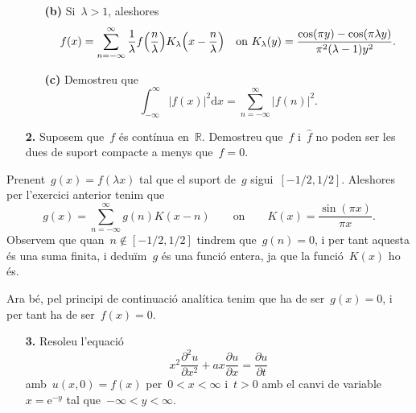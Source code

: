 \documentclass[a4paper]{article}
\theoremstyle{plain}
\theoremstyle{definition}
\newcommand{\e}{\mathrm{e}}
\providecommand{\uppi}{\pi}
\newcommand{\diff}{\mathrm{d}}
\newcommand{\abs}[1]{\lvert{#1}\rvert}
\newcommand{\RR}{\mathbb{R}}
\begin{document}
\begin{enumerate}
    \item[]\begin{enumerate}
        \item[\textbf{(b)}] Si~\(\lambda > 1\), aleshores
            \[
                f(x) =
                \sum_{n=-\infty}^{\infty}
                \frac{1}{\lambda} f\Bigl(\frac{n}{\lambda}\Bigr)
                K_{\lambda}\Bigl(x-\frac{n}{\lambda}\Bigr)
                \quad\text{on}\ %
                K_{\lambda}(y) =
                \frac{\cos(\uppi y) - \cos(\uppi\lambda y)}
                {\uppi^{2}(\lambda-1)y^{2}}.
            \]
    \end{enumerate}
\end{enumerate}


\begin{enumerate}
    \item[]\begin{enumerate}
        \item[\textbf{(c)}] Demostreu que
            \[
                \int_{-\infty}^{\infty}
                \abs{f(x)}^{2}
                \diff x
                =
                \sum_{n=-\infty}^{\infty}
                \abs{f(n)}^{2}.
            \]
    \end{enumerate}
\end{enumerate}

\begin{enumerate}
    \item[\textbf{2.}] Suposem que~\(f\) és contínua en~\(\RR\).
        Demostreu que~\(f\) i~\(\widehat{f}\) no poden ser les dues de suport
        compacte a menys que~\(f=0\).
\end{enumerate}

Prenent~\(g(x)=f(\lambda x)\) tal que el suport de~\(g\) sigui~\([-1/2,1/2]\).
Aleshores per l'exercici anterior tenim que
\[
    g(x)
    =
    \sum_{n=-\infty}^{\infty}
    g(n)
    K(x-n)
    \qquad\text{on}\qquad
    K(x)
    =
    \frac{\sin(\uppi x)}{\uppi x}.
\]
Observem que quan~\(n\notin[-1/2,1/2]\) tindrem que~\(g(n)=0\), i per tant
aquesta és una suma finita, i deduïm~\(g\) és una funció entera, ja que la
funció~\(K(x)\) ho és.

Ara bé, pel principi de continuació analítica tenim que ha de ser~\(g(x)=0\),
i per tant ha de ser~\(f(x)=0\).

\begin{enumerate}
    \item[\textbf{3.}] Resoleu l'equació
        \[
            x^{2}\frac{\partial^{2}u}{\partial x^{2}}
            + ax\frac{\partial u}{\partial x}
            = \frac{\partial u}{\partial t}
        \]
        amb~\(u(x,0) = f(x)\) per~\(0<x<\infty\) i~\(t>0\) amb el canvi de
        variable~\(x=\e^{-y}\) tal que~\(-\infty<y<\infty\).
\end{enumerate}
\end{document}
